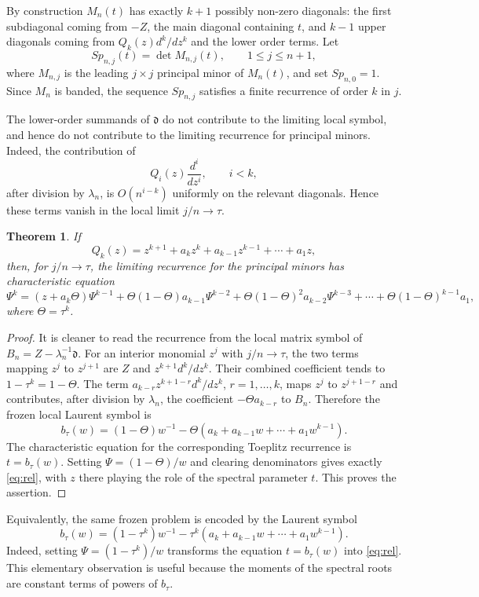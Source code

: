 \documentclass[10pt,twoside,a4paper,reqno]{amsart}
\theoremstyle{plain}
\newtheorem{theo}           {Theorem}
\theoremstyle{definition}
\theoremstyle{remark}
\newenvironment{theorem}{\begin{theo}}{\end{theo}}
\newcommand {\dq}{\mathfrak d}
\begin{document}
By construction $M_n(t)$ has exactly $k+1$ possibly non-zero diagonals: the first subdiagonal coming from $-Z$, the main diagonal containing $t$, and $k-1$ upper diagonals coming from $Q_k(z)d^k/dz^k$ and the lower order terms. Let
\[
Sp_{n,j}(t)=\det M_{n,j}(t),\qquad 1\le j\le n+1,
\]
where $M_{n,j}$ is the leading $j\times j$ principal minor of $M_n(t)$, and set $Sp_{n,0}=1$. Since $M_n$ is banded, the sequence $Sp_{n,j}$ satisfies a finite recurrence of order $k$ in $j$.

The lower-order summands of $\dq$ do not contribute to the limiting local symbol, and hence do not contribute to the limiting recurrence for principal minors. Indeed, the contribution of
\[
Q_i(z)\frac{d^i}{dz^i},\qquad i<k,
\]
after division by $\lambda_n$, is $O(n^{i-k})$ uniformly on the relevant diagonals. Hence these terms vanish in the local limit $j/n\to\tau$.

\begin{theorem}\label{th:rec}
If
\[
Q_k(z)=z^{k+1}+a_kz^k+a_{k-1}z^{k-1}+\cdots+a_1z,
\]
then, for $j/n\to\tau$, the limiting recurrence for the principal minors has characteristic equation
\begin{equation}\label{eq:rel}
\Psi^k=(z+a_k\Theta)\Psi^{k-1}
+\Theta(1-\Theta)a_{k-1}\Psi^{k-2}
+\Theta(1-\Theta)^2a_{k-2}\Psi^{k-3}
+\cdots+
\Theta(1-\Theta)^{k-1}a_1,
\end{equation}
where $\Theta=\tau^k$.
\end{theorem}

\begin{proof}
It is cleaner to read the recurrence from the local matrix symbol of
$B_n=Z-\lambda_n^{-1}\dq$.  For an interior monomial $z^j$ with
$j/n\to\tau$, the two terms mapping $z^j$ to $z^{j+1}$ are $Z$ and
$z^{k+1}d^k/dz^k$.  Their combined coefficient tends to
$1-\tau^k=1-\Theta$.  The term
$a_{k-r}z^{k+1-r}d^k/dz^k$, $r=1,\ldots,k$, maps $z^j$ to $z^{j+1-r}$
and contributes, after division by $\lambda_n$, the coefficient
$-\Theta a_{k-r}$ to $B_n$.  Therefore the frozen local Laurent symbol is
\[
        b_\tau(w)=(1-\Theta)w^{-1}
        -\Theta(a_k+a_{k-1}w+\cdots+a_1w^{k-1}).
\]
The characteristic equation for the corresponding Toeplitz recurrence is
$t=b_\tau(w)$.  Setting $\Psi=(1-\Theta)/w$ and clearing denominators gives
exactly \eqref{eq:rel}, with $z$ there playing the role of the spectral
parameter $t$.  This proves the assertion.
\end{proof}


Equivalently, the same frozen problem is encoded by the Laurent symbol
\begin{equation}\label{eq:symbol}
        b_\tau(w)=(1-\tau^k)w^{-1}-\tau^k(a_k+a_{k-1}w+\cdots+a_1w^{k-1}).
\end{equation}
Indeed, setting $\Psi=(1-\tau^k)/w$ transforms the equation $t=b_\tau(w)$ into \eqref{eq:rel}.  This elementary observation is useful because the moments of the spectral roots are constant terms of powers of $b_\tau$.
\end{document}
